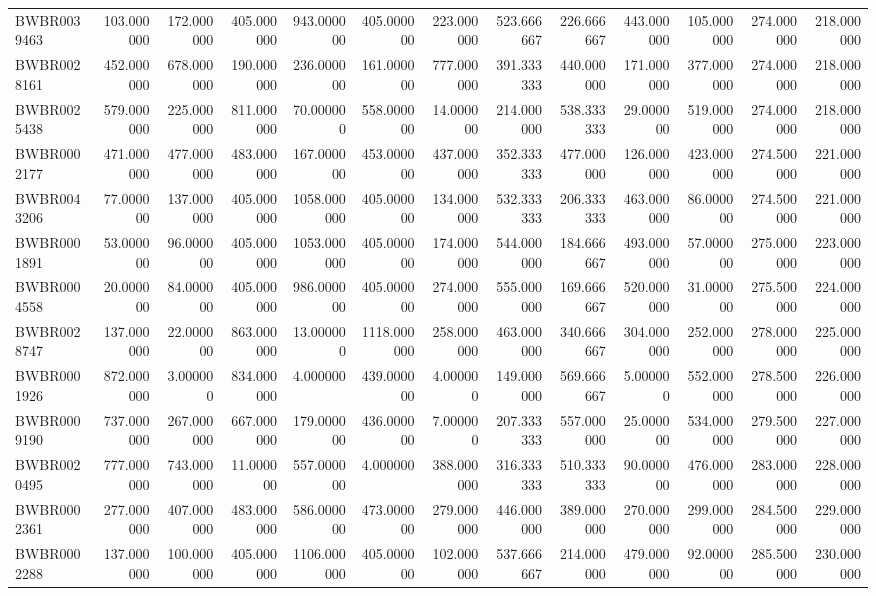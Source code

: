 \begin{longtable}{lrrrrrrrrrrrr}
BWBR0039463 & 103.000000 & 172.000000 & 405.000000 & 943.000000 & 405.000000 & 223.000000 & 523.666667 & 226.666667 & 443.000000 & 105.000000 & 274.000000 & 218.000000 \\
BWBR0028161 & 452.000000 & 678.000000 & 190.000000 & 236.000000 & 161.000000 & 777.000000 & 391.333333 & 440.000000 & 171.000000 & 377.000000 & 274.000000 & 218.000000 \\
BWBR0025438 & 579.000000 & 225.000000 & 811.000000 & 70.000000 & 558.000000 & 14.000000 & 214.000000 & 538.333333 & 29.000000 & 519.000000 & 274.000000 & 218.000000 \\
BWBR0002177 & 471.000000 & 477.000000 & 483.000000 & 167.000000 & 453.000000 & 437.000000 & 352.333333 & 477.000000 & 126.000000 & 423.000000 & 274.500000 & 221.000000 \\
BWBR0043206 & 77.000000 & 137.000000 & 405.000000 & 1058.000000 & 405.000000 & 134.000000 & 532.333333 & 206.333333 & 463.000000 & 86.000000 & 274.500000 & 221.000000 \\
BWBR0001891 & 53.000000 & 96.000000 & 405.000000 & 1053.000000 & 405.000000 & 174.000000 & 544.000000 & 184.666667 & 493.000000 & 57.000000 & 275.000000 & 223.000000 \\
BWBR0004558 & 20.000000 & 84.000000 & 405.000000 & 986.000000 & 405.000000 & 274.000000 & 555.000000 & 169.666667 & 520.000000 & 31.000000 & 275.500000 & 224.000000 \\
BWBR0028747 & 137.000000 & 22.000000 & 863.000000 & 13.000000 & 1118.000000 & 258.000000 & 463.000000 & 340.666667 & 304.000000 & 252.000000 & 278.000000 & 225.000000 \\
BWBR0001926 & 872.000000 & 3.000000 & 834.000000 & 4.000000 & 439.000000 & 4.000000 & 149.000000 & 569.666667 & 5.000000 & 552.000000 & 278.500000 & 226.000000 \\
BWBR0009190 & 737.000000 & 267.000000 & 667.000000 & 179.000000 & 436.000000 & 7.000000 & 207.333333 & 557.000000 & 25.000000 & 534.000000 & 279.500000 & 227.000000 \\
BWBR0020495 & 777.000000 & 743.000000 & 11.000000 & 557.000000 & 4.000000 & 388.000000 & 316.333333 & 510.333333 & 90.000000 & 476.000000 & 283.000000 & 228.000000 \\
BWBR0002361 & 277.000000 & 407.000000 & 483.000000 & 586.000000 & 473.000000 & 279.000000 & 446.000000 & 389.000000 & 270.000000 & 299.000000 & 284.500000 & 229.000000 \\
BWBR0002288 & 137.000000 & 100.000000 & 405.000000 & 1106.000000 & 405.000000 & 102.000000 & 537.666667 & 214.000000 & 479.000000 & 92.000000 & 285.500000 & 230.000000 \\

\end{longtable}
